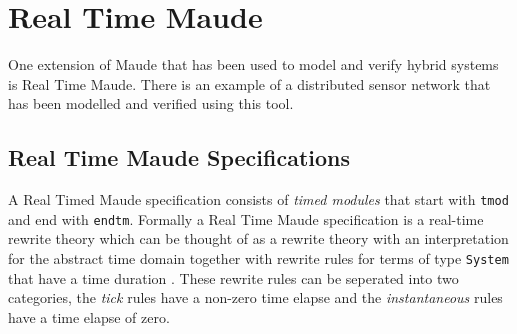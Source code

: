 \section{Real Time Maude}
One extension of Maude that has been used to model and verify hybrid systems is Real Time Maude. There is an example of a distributed sensor network that has been modelled and verified using this tool.
\subsection{Real Time Maude Specifications}
A Real Timed Maude specification consists of \emph{timed modules} that start with \texttt{tmod} and end with \texttt{endtm}. Formally a Real Time Maude specification is a real-time rewrite theory which can be thought of as a rewrite theory with an interpretation for the abstract time domain together with rewrite rules for terms of type \texttt{System} that have a time duration \cite{PO02}. These rewrite rules can be seperated into two categories, the \emph{tick} rules have a non-zero time elapse and the \emph{instantaneous} rules have a time elapse of zero.

 


